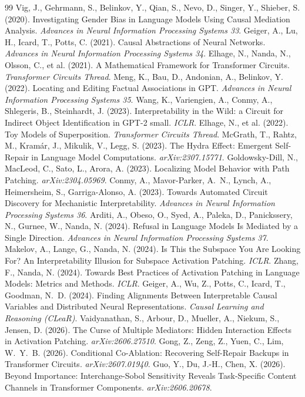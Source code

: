 \documentclass[11pt,a4paper]{article}
\begin{document}
\begin{thebibliography}{99}
 Vig, J., Gehrmann, S., Belinkov, Y., Qian, S., Nevo, D., Singer, Y., Shieber, S. (2020). Investigating Gender Bias in Language Models Using Causal Mediation Analysis. \emph{Advances in Neural Information Processing Systems 33}.
 Geiger, A., Lu, H., Icard, T., Potts, C. (2021). Causal Abstractions of Neural Networks. \emph{Advances in Neural Information Processing Systems 34}.
 Elhage, N., Nanda, N., Olsson, C., et al. (2021). A Mathematical Framework for Transformer Circuits. \emph{Transformer Circuits Thread}.
 Meng, K., Bau, D., Andonian, A., Belinkov, Y. (2022). Locating and Editing Factual Associations in GPT. \emph{Advances in Neural Information Processing Systems 35}.
 Wang, K., Variengien, A., Conmy, A., Shlegeris, B., Steinhardt, J. (2023). Interpretability in the Wild: a Circuit for Indirect Object Identification in GPT-2 small. \emph{ICLR}.
 Elhage, N., et al. (2022). Toy Models of Superposition. \emph{Transformer Circuits Thread}.
 McGrath, T., Rahtz, M., Kram\'ar, J., Mikulik, V., Legg, S. (2023). The Hydra Effect: Emergent Self-Repair in Language Model Computations. \emph{arXiv:2307.15771}.
 Goldowsky-Dill, N., MacLeod, C., Sato, L., Arora, A. (2023). Localizing Model Behavior with Path Patching. \emph{arXiv:2304.05969}.
 Conmy, A., Mavor-Parker, A.~N., Lynch, A., Heimersheim, S., Garriga-Alonso, A. (2023). Towards Automated Circuit Discovery for Mechanistic Interpretability. \emph{Advances in Neural Information Processing Systems 36}.
 Arditi, A., Obeso, O., Syed, A., Paleka, D., Panickssery, N., Gurnee, W., Nanda, N. (2024). Refusal in Language Models Is Mediated by a Single Direction. \emph{Advances in Neural Information Processing Systems 37}.
 Makelov, A., Lange, G., Nanda, N. (2024). Is This the Subspace You Are Looking For? An Interpretability Illusion for Subspace Activation Patching. \emph{ICLR}.
 Zhang, F., Nanda, N. (2024). Towards Best Practices of Activation Patching in Language Models: Metrics and Methods. \emph{ICLR}.
 Geiger, A., Wu, Z., Potts, C., Icard, T., Goodman, N.~D. (2024). Finding Alignments Between Interpretable Causal Variables and Distributed Neural Representations. \emph{Causal Learning and Reasoning (CLeaR)}.
 Vaidyanathan, S., Arbour, D., Mueller, A., Niekum, S., Jensen, D. (2026). The Curse of Multiple Mediators: Hidden Interaction Effects in Activation Patching. \emph{arXiv:2606.27510}.
 Gong, Z., Zeng, Z., Yuen, C., Lim, W.~Y.~B. (2026). Conditional Co-Ablation: Recovering Self-Repair Backups in Transformer Circuits. \emph{arXiv:2607.01940}.
 Guo, Y., Du, J.-H., Chen, X. (2026). Beyond Importance: Interchange-Sobol Sensitivity Reveals Task-Specific Content Channels in Transformer Components. \emph{arXiv:2606.20678}.
\end{thebibliography}
\end{document}
